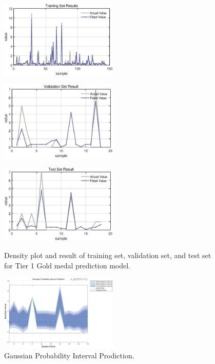 \documentclass{mcmthesis}
\begin{document}
\begin{figure}[htbp]
    \begin{minipage}[t]{0.3\textwidth}
        \centering
        \includegraphics[width=2.2in, keepaspectratio]{pics/2.eps}
        \label{fig:image4}
    \end{minipage}
    \hfill
    \begin{minipage}[t]{0.3\textwidth}
        \centering
        \includegraphics[width=2.2in, keepaspectratio]{pics/4.eps}
        \label{fig:image5}
    \end{minipage}
    \hfill
    \begin{minipage}[t]{0.3\textwidth}
        \centering
        \includegraphics[width=2.2in, keepaspectratio]{pics/6.eps}
        \label{fig:image6}
    \end{minipage}
    
    \caption{Density plot and result of training set, validation set, and test set for Tier 1 Gold medal prediction model.}

    
    \label{fig:smaller_eps_images}
\end{figure}


    

\begin{figure}  %
    \centering
    \includegraphics[width=0.5\textwidth]{pics/Gaussian Probability Interval Prediction.eps}
    \caption{Gaussian Probability Interval Prodiction.}
    \label{fig:Probability_Interval_Prediction}
\end{figure}
\end{document}
